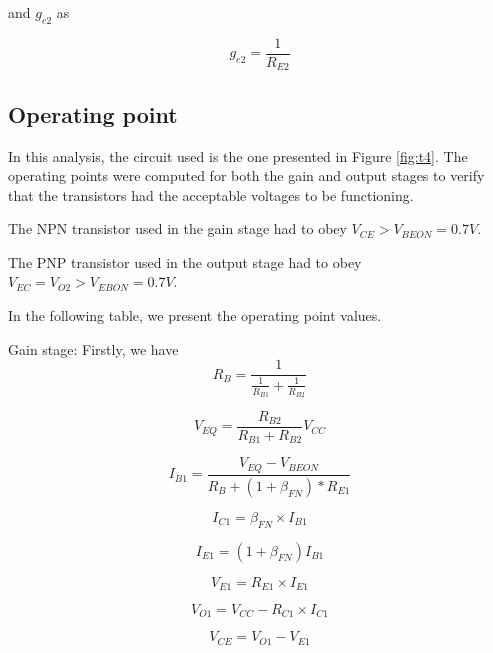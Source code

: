 and $g_{e2}$ as 

\begin{equation*} \label{eq10}
g_{e2} = \frac{1}{R_{E2}}
\end{equation*}

\subsection{Operating point}
In this analysis, the circuit used is the one presented in Figure \ref{fig:t4}.
The operating points were computed for both the gain and output stages to verify that the transistors had the acceptable voltages to be functioning. \par
The NPN transistor used in the gain stage had to obey $V_{CE}>V_{BEON}=0.7 V$. \par
The PNP transistor used in the output stage had to obey $V_{EC}=V_{O2}>V_{EBON}=0.7 V$. \par
In the following table, we present the operating point values.

\quad Gain stage:
Firstly, we have
\begin{equation*}
R_B=\frac{1}{\frac{1}{R_{B1}}+\frac{1}{R_{B2}}}
\end{equation*}

\begin{equation*}
V_{EQ}=\frac{R_{B2}}{R_{B1}+R_{B2}}V_{CC}
\end{equation*}

\begin{equation*}
I_{B1}=\frac{V_{EQ}-V_{BEON}}{R_B+(1+\beta _{FN})*R_{E1}}
\end{equation*}

\begin{equation*}
I_{C1}=\beta _{FN}\times I_{B1}
\end{equation*}

\begin{equation*}
I_{E1}=(1+\beta _{FN})I_{B1}
\end{equation*}

\begin{equation*}
V_{E1}=R_{E1}\times I_{E1}
\end{equation*}

\begin{equation*}
V_{O1}=V_{CC}-R_{C1}\times I_{C1}
\end{equation*}

\begin{equation*}
V_{CE}=V_{O1}-V_{E1}
\end{equation*}

